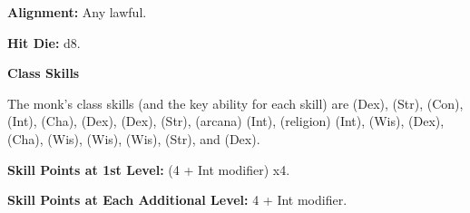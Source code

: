 


\textbf{Alignment:} Any lawful.

\textbf{Hit Die:} d8.

\textbf{Class Skills}

The monk's class skills (and the key ability for each skill) are  (Dex), 
 (Str),  (Con),  (Int),  (Cha),  (Dex), 
 (Dex),  (Str),  (arcana) (Int),  (religion) (Int),  
(Wis),  (Dex),  (Cha),  (Wis),  (Wis), 
 (Wis),  (Str), and  (Dex).

\textbf{Skill Points at 1st Level:} (4 + Int modifier) x4.

\textbf{Skill Points at Each Additional Level:} 4 + Int modifier.

